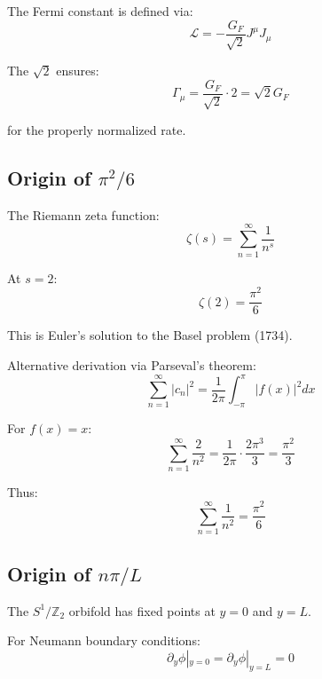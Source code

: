 \documentclass[11pt,a4paper]{article}
\begin{document}
The Fermi constant is defined via:
\begin{equation}
\label{eq:gf-def}
\mathcal{L} = -\frac{G_F}{\sqrt{2}} J^\mu J_\mu
\end{equation}

The $\sqrt{2}$ ensures:
\begin{equation}
\label{eq:sqrt2-reason}
\Gamma_\mu = \frac{G_F}{\sqrt{2}} \cdot 2 = \sqrt{2} G_F
\end{equation}

for the properly normalized rate.

\subsection{Origin of $\pi^2/6$}
\label{app:factor-pi26}

The Riemann zeta function:
\begin{equation}
\label{eq:zeta-def}
\zeta(s) = \sum_{n=1}^\infty \frac{1}{n^s}
\end{equation}

At $s = 2$:
\begin{equation}
\label{eq:zeta-2-value}
\zeta(2) = \frac{\pi^2}{6}
\end{equation}

This is Euler's solution to the Basel problem (1734).

Alternative derivation via Parseval's theorem:
\begin{equation}
\label{eq:parseval}
\sum_{n=1}^\infty |c_n|^2 = \frac{1}{2\pi} \int_{-\pi}^{\pi} |f(x)|^2 dx
\end{equation}

For $f(x) = x$:
\begin{equation}
\label{eq:parseval-result}
\sum_{n=1}^\infty \frac{2}{n^2} = \frac{1}{2\pi} \cdot \frac{2\pi^3}{3} = \frac{\pi^2}{3}
\end{equation}

Thus:
\begin{equation}
\label{eq:zeta-from-parseval}
\sum_{n=1}^\infty \frac{1}{n^2} = \frac{\pi^2}{6}
\end{equation}

\subsection{Origin of $n\pi/L$}
\label{app:factor-npi}

The $S^1/\mathbb{Z}_2$ orbifold has fixed points at $y = 0$ and $y = L$.

For Neumann boundary conditions:
\begin{equation}
\label{eq:neumann-bc}
\partial_y \phi|_{y=0} = \partial_y \phi|_{y=L} = 0
\end{equation}
\end{document}
